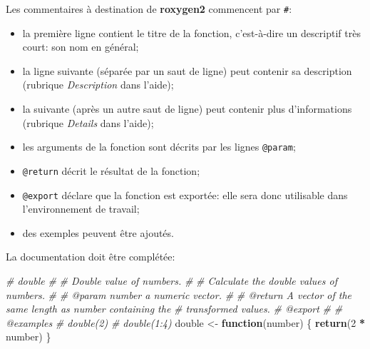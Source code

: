 \documentclass[
  12pt,
  french,
  a4paper,
  extrafontsizes,onecolumn,openright
  ]{memoir}
\newenvironment{Shaded}{\begin{snugshade}}{\end{snugshade}}
\newcommand{\CommentTok}[1]{\textcolor[rgb]{0.56,0.35,0.01}{\textit{#1}}}
\newcommand{\ControlFlowTok}[1]{\textcolor[rgb]{0.13,0.29,0.53}{\textbf{#1}}}
\newcommand{\DecValTok}[1]{\textcolor[rgb]{0.00,0.00,0.81}{#1}}
\newcommand{\FunctionTok}[1]{\textcolor[rgb]{0.13,0.29,0.53}{\textbf{#1}}}
\newcommand{\NormalTok}[1]{#1}
\newcommand{\OtherTok}[1]{\textcolor[rgb]{0.56,0.35,0.01}{#1}}
\newcommand{\SpecialCharTok}[1]{\textcolor[rgb]{0.81,0.36,0.00}{\textbf{#1}}}
\providecommand{\tightlist}{%
  \setlength{\itemsep}{0pt}\setlength{\parskip}{0pt}}
\begin{document}
\normalsize

Les commentaires à destination de \textbf{roxygen2} commencent par \texttt{\#\textquotesingle{}}:

\begin{itemize}
\tightlist
\item
  la première ligne contient le titre de la fonction, c'est-à-dire un descriptif très court: son nom en général;
\item
  la ligne suivante (séparée par un saut de ligne) peut contenir sa description (rubrique \emph{Description} dans l'aide);
\item
  la suivante (après un autre saut de ligne) peut contenir plus d'informations (rubrique \emph{Details} dans l'aide);
\item
  les arguments de la fonction sont décrits par les lignes \texttt{@param};
\item
  \texttt{@return} décrit le résultat de la fonction;
\item
  \texttt{@export} déclare que la fonction est exportée: elle sera donc utilisable dans l'environnement de travail;
\item
  des exemples peuvent être ajoutés.
\end{itemize}

La documentation doit être complétée:

\scriptsize

\begin{Shaded}
\begin{Highlighting}[]
\CommentTok{\#\textquotesingle{} double}
\CommentTok{\#\textquotesingle{} }
\CommentTok{\#\textquotesingle{} Double value of numbers.}
\CommentTok{\#\textquotesingle{}}
\CommentTok{\#\textquotesingle{} Calculate the double values of numbers.}
\CommentTok{\#\textquotesingle{} }
\CommentTok{\#\textquotesingle{} @param number a numeric vector.}
\CommentTok{\#\textquotesingle{}}
\CommentTok{\#\textquotesingle{} @return A vector of the same length as \textasciigrave{}number\textasciigrave{} containing the }
\CommentTok{\#\textquotesingle{}   transformed values.}
\CommentTok{\#\textquotesingle{} @export}
\CommentTok{\#\textquotesingle{}}
\CommentTok{\#\textquotesingle{} @examples}
\CommentTok{\#\textquotesingle{} double(2)}
\CommentTok{\#\textquotesingle{} double(1:4)}
\NormalTok{double }\OtherTok{\textless{}{-}} \ControlFlowTok{function}\NormalTok{(number) \{}
  \FunctionTok{return}\NormalTok{(}\DecValTok{2} \SpecialCharTok{*}\NormalTok{ number)}
\NormalTok{\}}
\end{Highlighting}
\end{Shaded}
\end{document}
